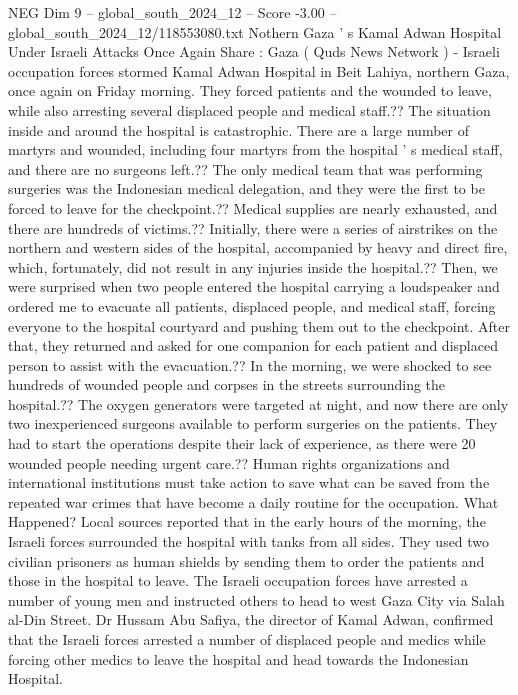 \begin{textsample}{NEG Dim 9 – global\_south\_2024\_12 – Score -3.00 – global\_south\_2024\_12/118553080.txt}  \label{ex:f9_neg_131}
Nothern Gaza ' s Kamal Adwan Hospital Under Israeli Attacks Once Again Share : Gaza ( Quds News Network ) - Israeli occupation forces stormed Kamal Adwan Hospital in Beit Lahiya, northern Gaza, once again on Friday morning.
They forced patients and the wounded to leave, while also arresting several displaced people and medical staff.??
The situation inside and around the hospital is catastrophic.
There are a large number of martyrs and wounded, including four martyrs from the hospital ' s medical staff, and there are no surgeons left.??
The only medical team that was performing surgeries was the Indonesian medical delegation, and they were the first to be forced to leave for the checkpoint.??
Medical supplies are nearly exhausted, and there are hundreds of victims.??
Initially, there were a series of airstrikes on the northern and western sides of the hospital, accompanied by heavy and direct fire, which, fortunately, did not result in any injuries inside the hospital.??
Then, we were surprised when two people entered the hospital carrying a loudspeaker and ordered me to evacuate all patients, displaced people, and medical staff, forcing everyone to the hospital courtyard and pushing them out to the checkpoint.
After that, they returned and asked for one companion for each patient and displaced person to assist with the evacuation.??
In the morning, we were shocked to see hundreds of wounded people and corpses in the streets surrounding the hospital.??
The oxygen generators were targeted at night, and now there are only two inexperienced surgeons available to perform surgeries on the patients.
They had to start the operations despite their lack of experience, as there were 20 wounded people needing urgent care.??
Human rights organizations and international institutions must take action to save what can be saved from the repeated war crimes that have become a daily routine for the occupation.
What Happened?
Local sources reported that in the early hours of the morning, the Israeli forces surrounded the hospital with tanks from all sides.
They used two civilian prisoners as human shields by sending them to order the patients and those in the hospital to leave.
The Israeli occupation forces have arrested a number of young men and instructed others to head to west Gaza City via Salah al-Din Street.
Dr Hussam Abu Safiya, the director of Kamal Adwan, confirmed that the Israeli forces arrested a number of displaced people and medics while forcing other medics to leave the hospital and head towards the Indonesian Hospital.

\end{textsample}

